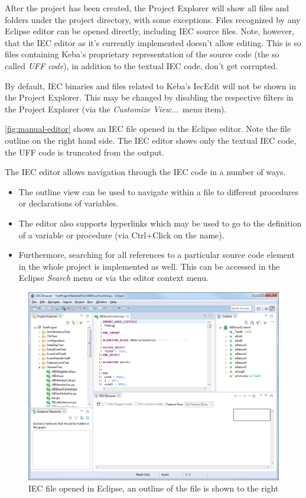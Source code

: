 After the project has been created, the Project Explorer will show all files and folders under the project directory, 
with some exceptions. Files recognized by any Eclipse editor can be opened directly, including IEC source files. Note, 
however, that the IEC editor as it's currently implemented doesn't allow editing. This is so files containing Keba's 
proprietary representation of the source code (the so called \emph{UFF code}), in addition to the textual IEC code, 
don't get corrupted.

By default, IEC binaries and files related to Keba's IecEdit will not be shown in the Project Explorer. This may be 
changed by disabling the respective filters in the Project Explorer (via the \emph{Customize View...}\ menu item).

\autoref{fig:manual-editor} shows an IEC file opened in the Eclipse editor. Note the file outline on the right hand 
side. The IEC editor shows only the textual IEC code, the UFF code is truncated from the output.

The IEC editor allows navigation through the IEC code in a number of ways.

\begin{itemize}
  \item The outline view can be used to navigate within a file to different procedures or declarations of variables.
  
  \item The editor also supports hyperlinks which may be used to go to the definition of a variable or procedure (via 
  Ctrl+Click on the name).
  
  \item Furthermore, searching for all references to a particular source code element in the whole project is 
  implemented as well. This can be accessed in the Eclipse \emph{Search} menu or via the editor context menu.
\end{itemize}

\begin{figure}[hp]
  \centering
    \includegraphics[width=\textwidth]{bilder/manual-editor}
  \caption{IEC file opened in Eclipse, an outline of the file is shown to the right}
  \label{fig:manual-editor}
\end{figure}


